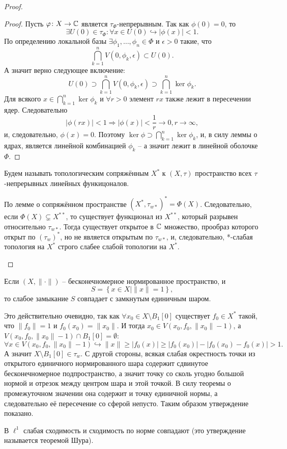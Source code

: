 \begin{proof}
\begin{enumerate}
\begin{proof}
            Пусть $\varphi\colon X \to \mathbb{C}$ является $\tau_{\Phi}$-непрерывным.
            Так как $\phi(0) = 0$, то
            \[
                \exists U(0) \in \tau_{\Phi}\colon \forall x \in U(0) \hookrightarrow |\phi(x)| < 1.
            \]
            По определению локальной базы $\exists \phi_1, \ldots, \phi_n \in \Phi$ и $\epsilon > 0$ такие, что
            \[
                \bigcap_{k = 1}^{n} V(0, \phi_k, \epsilon) \subset U(0).
            \]
            А значит верно следующее включение:
            \[
                U(0) \supset \bigcap_{k = 1}^{n} V(0, \phi_k, \epsilon) \supset \bigcap_{k = 1}^{n} \ker \phi_k.
            \]
            Для всякого $x \in \bigcap_{k = 1}^{n} \ker \phi_k$ и $\forall r > 0$ элемент $rx$ также лежит в пересечении ядер.
            Следовательно
            \[
                |\phi(rx)| < 1 \Rightarrow |\phi(x)| < \frac{1}{r} \rightarrow 0, r \rightarrow \infty,
            \]
            и, следовательно, $\phi(x) = 0$.
            Поэтому $\ker \phi \supset \bigcap_{k = 1}^{n} \ker \phi_k$, и, в силу леммы о ядрах, является линейной комбинацией $\phi_k$ -- а значит лежит в линейной оболочке $\Phi$.
        \end{proof}
        \begin{definition}
            Будем называть топологическим сопряжённым $X^*$ к $(X, \tau)$ пространство всех $\tau$-непрерывных линейных функицоналов.
        \end{definition}
        По лемме о сопряжённом пространстве $(X^*, \tau_{w*})^* = \Phi(X)$.
        Следовательно, если $\Phi(X) \subsetneq X^{**}$, то существует функционал из $X^{**}$, который разрывен относительно $\tau_{w*}$.
        Тогда существует открытое в $\mathbb{C}$ множество, прообраз которого открыт по $(\tau_w)^*$, но не является открытым по $\tau_{w*}$, и, следовательно, *-слабая топология на $X^*$ строго слабее слабой топологии на $X^*$.
    \end{enumerate}

\end{proof}
\begin{note}
    Если $(X, \|\cdot\|)$ -- бесконечномерное нормированное пространство, и
    \[
        S = \left\{x \in X \mid \|x\| = 1\right\},
    \]
    то слабое замыкание $S$ совпадает с замкнутым единичным шаром.

    Это действительно очевидно, так как $\forall x_0 \in X \setminus B_1[0]$ существует $f_0 \in X^*$ такой, что $\|f_0\| = 1$ и $f_0(x_0) = \|x_0\|$.
    И тогда $x_0 \in V(x_0, f_0, \|x_0\| - 1)$, а $V(x_0, f_0, \|x_0\| - 1) \cap B_1[0] = \emptyset$:
    \[
        \forall x \in V(x_0, f_0, \|x_0\| - 1) \hookrightarrow \|x\| \geq |f_0(x)| \geq |f_0(x_0)| - |f_0(x_0) - f_0(x)| > 1.
    \]
    А значит $X \setminus B_1[0] \in \tau_w$.
    С другой стороны, всякая слабая окрестность точки из открытого единичного нормированного шара содержит сдвинутое бесконечномерное подпространство, а значит точку со сколь угодно большой нормой и отрезок между центром шара и этой точкой.
    В силу теоремы о промежуточном значении она содержит и точку единичной нормы, а следовательно её пересечение со сферой непусто.
    Таким образом утверждение показано.
\end{note}
\begin{note}
    В $\ell^1$ слабая сходимость и сходимость по норме совпадают (это утверждение называется теоремой Шура).
\end{note}